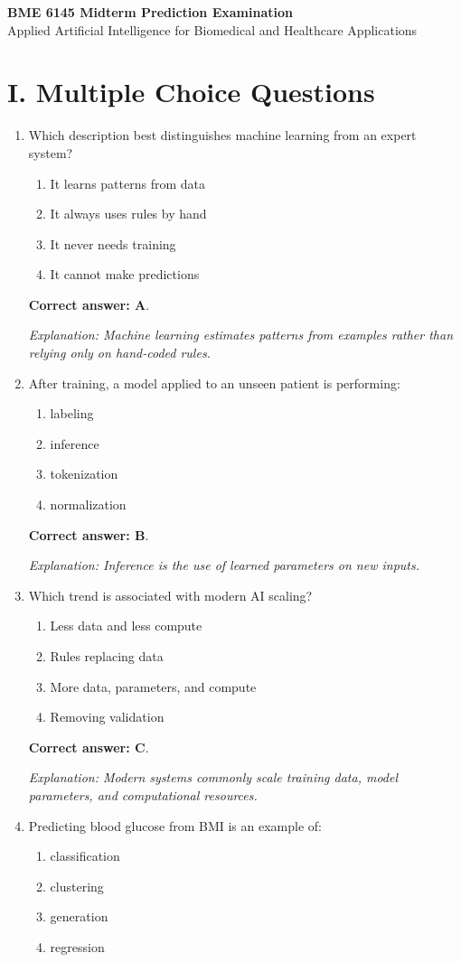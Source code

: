 \documentclass[10pt,a4paper]{article}
\newcommand{\ans}[1]{\par\textbf{Correct answer: #1}}
\newcommand{\expn}[1]{\par\textit{Explanation: #1}}
\begin{document}
\begin{center}
{\Large\bf BME 6145 Midterm Prediction Examination}\\
\small Applied Artificial Intelligence for Biomedical and Healthcare Applications
\end{center}

\section*{I. Multiple Choice Questions}
\begin{enumerate}[label=\textbf{\arabic*.},itemsep=4pt]
\item Which description best distinguishes machine learning from an expert system?
\begin{enumerate}[label=\Alph*.,itemsep=0pt]\item It learns patterns from data\item It always uses rules by hand\item It never needs training\item It cannot make predictions\end{enumerate}
\ans{A}. \expn{Machine learning estimates patterns from examples rather than relying only on hand-coded rules.}
\item After training, a model applied to an unseen patient is performing:
\begin{enumerate}[label=\Alph*.,itemsep=0pt]\item labeling\item inference\item tokenization\item normalization\end{enumerate}
\ans{B}. \expn{Inference is the use of learned parameters on new inputs.}
\item Which trend is associated with modern AI scaling?
\begin{enumerate}[label=\Alph*.,itemsep=0pt]\item Less data and less compute\item Rules replacing data\item More data, parameters, and compute\item Removing validation\end{enumerate}
\ans{C}. \expn{Modern systems commonly scale training data, model parameters, and computational resources.}
\item Predicting blood glucose from BMI is an example of:
\begin{enumerate}[label=\Alph*.,itemsep=0pt]\item classification\item clustering\item generation\item regression\end{enumerate}

\end{enumerate}
\end{document}
